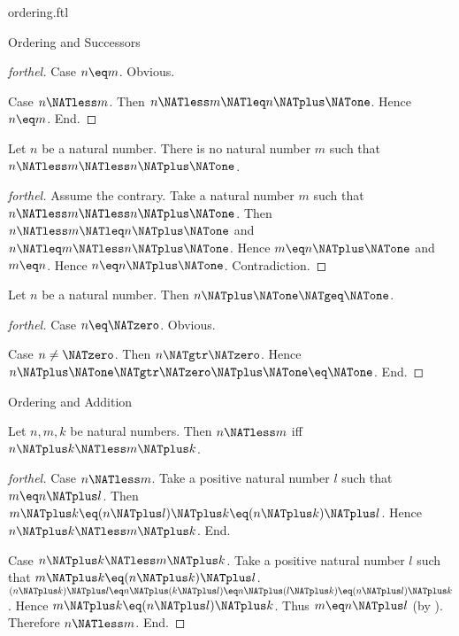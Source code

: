 \documentclass{naproche-library}
\begin{document}
\begin{smodule}[title=The Standard Ordering of the Natural Numbers]{ordering.ftl}
\begin{sfragment}{Ordering and Successors}
\begin{proof}[forthel]
    Case $n \eq m$. Obvious.

    Case $n \NATless m$.
      Then $n \NATless m \NATleq n \NATplus \NATone$.
      Hence $n \eq m$.
    End.
  \end{proof}

  \begin{corollary}[forthel,id=ARITHMETIC_04_1802826644717568]
    Let $n$ be a natural number.
    There is no natural number $m$ such that $n \NATless m \NATless n \NATplus \NATone$.
  \end{corollary}
  \begin{proof}[forthel]
    Assume the contrary.
    Take a natural number $m$ such that $n \NATless m \NATless n \NATplus \NATone$.
    Then $n \NATless m \NATleq n \NATplus \NATone$ and $n \NATleq m \NATless n \NATplus \NATone$.
    Hence $m \eq n \NATplus \NATone$ and $m \eq n$.
    Hence $n \eq n \NATplus \NATone$.
    Contradiction.
  \end{proof}

  \begin{proposition}[forthel,id=ARITHMETIC_04_990407185924096]
    Let $n$ be a natural number.
    Then $n \NATplus \NATone \NATgeq \NATone$.
  \end{proposition}
  \begin{proof}[forthel]
    Case $n \eq \NATzero$. Obvious.

    Case $n \neq \NATzero$.
      Then $n \NATgtr \NATzero$.
      Hence $n \NATplus \NATone \NATgtr \NATzero \NATplus \NATone \eq \NATone$.
    End.
  \end{proof}
\end{sfragment}

\begin{sfragment}{Ordering and Addition}
  \begin{proposition}[forthel,id=ARITHMETIC_04_7354062662008832]
    Let $n, m, k$ be natural numbers.
    Then $n \NATless m$ iff $n \NATplus k \NATless m \NATplus k$.
  \end{proposition}
  \begin{proof}[forthel]
    Case $n \NATless m$.
      Take a positive natural number $l$ such that $m \eq n \NATplus l$.
      Then $m \NATplus k
        \eq (n \NATplus l) \NATplus k
        \eq (n \NATplus k) \NATplus l$.
      Hence $n \NATplus k \NATless m \NATplus k$.
    End.

    Case $n \NATplus k \NATless m \NATplus k$.
      Take a positive natural number $l$ such that $m \NATplus k \eq (n \NATplus k) \NATplus l$.
      $(n \NATplus k) \NATplus l
        \eq n \NATplus (k \NATplus l)
        \eq n \NATplus (l \NATplus k)
        \eq (n \NATplus l) \NATplus k$.
      Hence $m \NATplus k \eq (n \NATplus l) \NATplus k$.
      Thus $m \eq n \NATplus l$ (by ).
      Therefore $n \NATless m$.
    End.
  \end{proof}


\end{sfragment}
\end{smodule}
\end{document}
